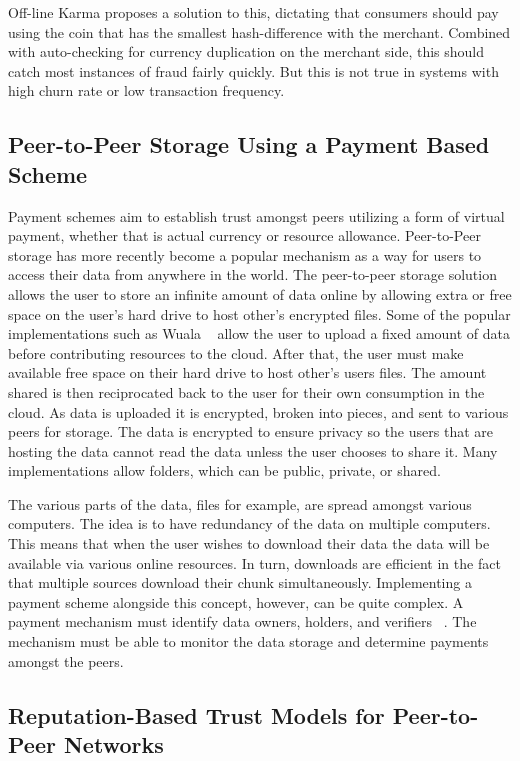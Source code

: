 \documentclass[%
				10pt,
        final,
        notitlepage,
        narroweqnarray,
        inline,
        twoside,
        ]{ieee}
\begin{document}
Off-line Karma proposes a solution to this, dictating that consumers should pay using the coin that has the smallest hash-difference with the merchant.  Combined with auto-checking for currency duplication on the merchant side, this should catch most instances of fraud fairly quickly.  But this is not true in systems with high churn rate or low transaction frequency.

\subsection{Peer-to-Peer Storage Using a Payment Based Scheme}
Payment schemes aim to establish trust amongst peers utilizing a form of virtual payment, whether that is actual currency or resource allowance.  Peer-to-Peer storage has more recently become a popular mechanism as a way for users to access their data from anywhere in the world.  The peer-to-peer storage solution allows the user to store an infinite amount of data online by allowing extra or free space on the user's hard drive to host other's encrypted files.  Some of the popular implementations such as Wuala ~\cite{martalo}  allow the user to upload a fixed amount of data before contributing resources to the cloud.  After that, the user must make available free space on their hard drive to host other's users files.  The amount shared is then reciprocated back to the user for their own consumption in the cloud.  As data is uploaded it is encrypted, broken into pieces, and sent to various peers for storage.  The data is encrypted to ensure privacy so the users that are hosting the data cannot read the data unless the user chooses to share it.  Many implementations allow folders, which can be public, private, or shared.  

The various parts of the data, files for example, are spread amongst various computers.  The idea is to have redundancy of the data on multiple computers.  This means that when the user wishes to download their data the data will be available via various online resources.  In turn, downloads are efficient in the fact that multiple sources download their chunk simultaneously.  Implementing a payment scheme alongside this concept, however, can be quite complex.  A payment mechanism must identify data owners, holders, and verifiers ~\cite{oualha}.  The mechanism must be able to monitor the data storage and determine payments amongst the peers.

\subsection{Reputation-Based Trust Models for Peer-to-Peer Networks}
\end{document}
